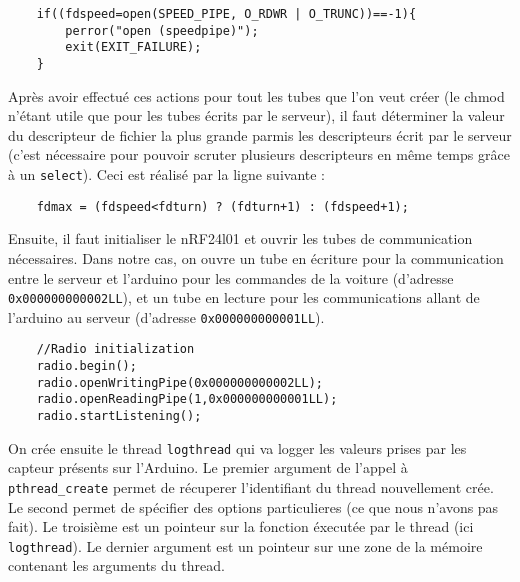\begin{DDbox}{\linewidth}
\begin{lstlisting}
	if((fdspeed=open(SPEED_PIPE, O_RDWR | O_TRUNC))==-1){
		perror("open (speedpipe)");
		exit(EXIT_FAILURE);
	}
\end{lstlisting}
\end{DDbox}

Après avoir effectué ces actions pour tout les tubes que l'on veut créer (le
chmod n'étant utile que pour les tubes écrits par le serveur), il faut 
déterminer la valeur du descripteur de fichier la plus grande parmis les 
descripteurs écrit par le serveur (c'est nécessaire pour pouvoir 
scruter plusieurs descripteurs en même temps grâce à un \texttt{select}). Ceci
est réalisé par la ligne suivante :\\

\begin{DDbox}{\linewidth}
\begin{lstlisting}
	fdmax = (fdspeed<fdturn) ? (fdturn+1) : (fdspeed+1);
\end{lstlisting}
\end{DDbox}

Ensuite, il faut initialiser le nRF24l01 et ouvrir les tubes de communication
nécessaires. Dans notre cas, on ouvre un tube en écriture pour la communication 
entre le serveur et l'arduino pour les commandes de la voiture (d'adresse 
\texttt{0x000000000002LL}), et un tube en lecture pour les communications allant
de l'arduino au serveur (d'adresse \texttt{0x000000000001LL}). \\

\begin{DDbox}{\linewidth}
\begin{lstlisting}
	//Radio initialization
	radio.begin();
	radio.openWritingPipe(0x000000000002LL);
	radio.openReadingPipe(1,0x000000000001LL);
	radio.startListening();
\end{lstlisting}
\end{DDbox}

On crée ensuite le thread \texttt{logthread} qui va logger les valeurs prises
par les capteur présents sur l'Arduino. Le premier argument de l'appel à
\texttt{pthread\_create} permet de récuperer l'identifiant du thread 
nouvellement crée. Le second permet de spécifier des options particulieres (ce
que nous n'avons pas fait). Le troisième est un pointeur sur la fonction 
éxecutée par le thread (ici \texttt{logthread}). Le dernier argument est un 
pointeur sur une zone de la mémoire contenant les arguments du thread. \\

